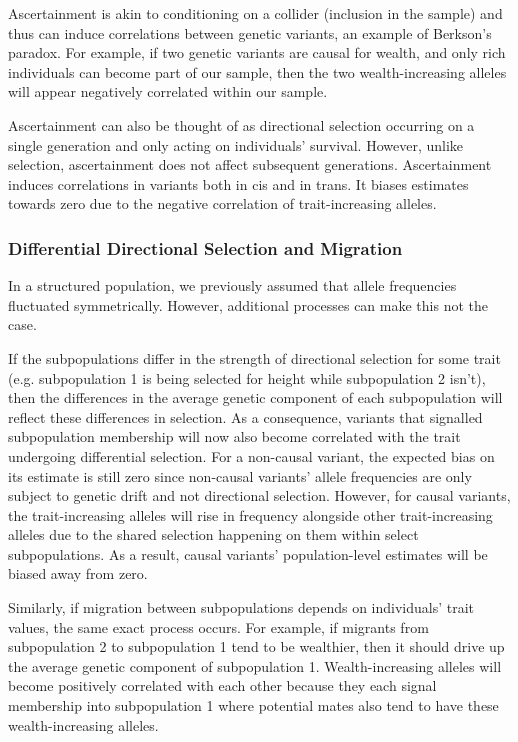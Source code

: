 \documentclass[12pt]{article}
\begin{document}
Ascertainment is akin to conditioning on a collider (inclusion in the sample) and thus can induce correlations between genetic variants, an example of Berkson's paradox.
For example, if two genetic variants are causal for wealth, and only rich individuals can become part of our sample, then the two wealth-increasing alleles will appear negatively correlated within our sample.

Ascertainment can also be thought of as directional selection occurring on a single generation and only acting on individuals' survival.
However, unlike selection, ascertainment does not affect subsequent generations.
Ascertainment induces correlations in variants both in cis and in trans.
It biases estimates towards zero due to the negative correlation of trait-increasing alleles.

\subsubsection{Differential Directional Selection and Migration}
In a structured population, we previously assumed that allele frequencies fluctuated symmetrically.
However, additional processes can make this not the case.

If the subpopulations differ in the strength of directional selection for some trait (e.g. subpopulation 1 is being selected for height while subpopulation 2 isn't), then the differences in the average genetic component of each subpopulation will reflect these differences in selection.
As a consequence, variants that signalled subpopulation membership will now also become correlated with the trait undergoing differential selection.
For a non-causal variant, the expected bias on its estimate is still zero since non-causal variants' allele frequencies are only subject to genetic drift and not directional selection.
However, for causal variants, the trait-increasing alleles will rise in frequency alongside other trait-increasing alleles due to the shared selection happening on them within select subpopulations.
As a result, causal variants' population-level estimates will be biased away from zero.

Similarly, if migration between subpopulations depends on individuals' trait values, the same exact process occurs.
For example, if migrants from subpopulation 2 to subpopulation 1 tend to be wealthier, then it should drive up the average genetic component of subpopulation 1.
Wealth-increasing alleles will become positively correlated with each other because they each signal membership into subpopulation 1 where potential mates also tend to have these wealth-increasing alleles.
\end{document}
